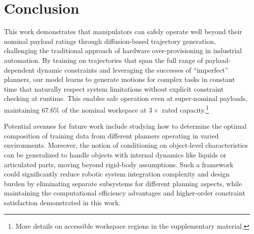 \section{Conclusion}


This work demonstrates that manipulators can safely operate well beyond their nominal payload ratings through diffusion-based trajectory generation, challenging the traditional approach of hardware over-provisioning in industrial automation.
By training on trajectories that span the full range of payload-dependent dynamic constraints and leveraging the successes of ``imperfect'' planners, our model learns to generate motions for complex tasks in constant time that naturally respect system limitations without explicit constraint checking at runtime. This enables safe operation even at super-nominal payloads, maintaining $67.6\%$ of the nominal workspace at $3\times$ rated capacity.\footnote{More details on accessible workspace regions in the supplementary material.}

Potential avenues for future work include studying how to determine the optimal composition of training data from different planners operating in varied environments.
Moreover, the notion of conditioning on object-level characteristics can be generalized to handle objects with internal dynamics like liquids or articulated parts, moving beyond rigid-body assumptions. 
Such a framework could significantly reduce robotic system integration complexity and design burden by eliminating separate subsystems for different planning aspects, while maintaining the computational efficiency advantages and higher-order constraint satisfaction demonstrated in this work.